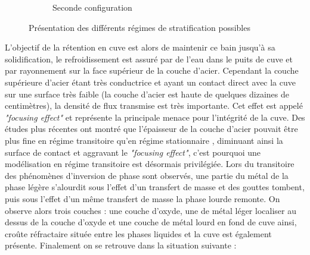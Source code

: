 \begin{figure}[H]
\begin{subfigure}[H]{0.47\textwidth}
\begin{tikzpicture}[scale=0.60]
	
	
	\end{tikzpicture}
	\caption{Seconde configuration}
	\label{fig:confmetalleger}
\end{subfigure}
\caption{Présentation des différents régimes de stratification possibles}
\end{figure}
L'objectif de la rétention en cuve est alors de maintenir ce bain jusqu’à sa solidification, le refroidissement est assuré par de l'eau dans le puits de cuve et par rayonnement sur la face supérieur de la couche d'acier. Cependant la couche supérieure d'acier étant très conductrice et ayant un contact direct avec la cuve sur une surface très faible (la couche d'acier est haute de quelques dizaines de centimètres), la densité de flux transmise est très importante. Cet effet est appelé \textit{"focusing effect"} et représente la principale menace pour l'intégrité de la cuve.
Des études plus récentes ont montré que l'épaisseur de la couche d'acier pouvait être plus fine en régime transitoire qu'en régime stationnaire \cite{le_tellier_transient_2015}, diminuant ainsi la surface de contact et aggravant le \textit{"focusing effect"}, c'est pourquoi une modélisation en régime transitoire est désormais privilégiée. Lors du transitoire des phénomènes d'inversion de phase sont observés, une partie du métal de la phase légère s'alourdit sous l'effet d'un transfert de masse et des gouttes tombent, puis sous l'effet d'un même transfert de masse la phase lourde remonte. On observe alors trois couches : une couche d'oxyde, une de métal léger localiser au dessus de la couche d'oxyde et une couche de métal lourd en fond de cuve ainsi, croûte réfractaire située entre les phases liquides et la cuve est également présente. Finalement on se retrouve dans la situation suivante :
